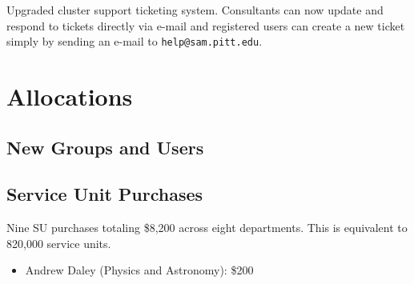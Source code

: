 Upgraded cluster support ticketing system.  Consultants can now update and
respond to tickets directly via e-mail and registered users can create a
new ticket simply by sending an e-mail to \texttt{help@sam.pitt.edu}.


\section{Allocations}
\subsection{New Groups and Users}
\subsection{Service Unit Purchases}
Nine SU purchases totaling \$8,200 across eight departments.  This is
equivalent to 820,000 service units.
\begin{itemize}
    \item Andrew Daley (Physics and Astronomy): \$200
\end{itemize}

